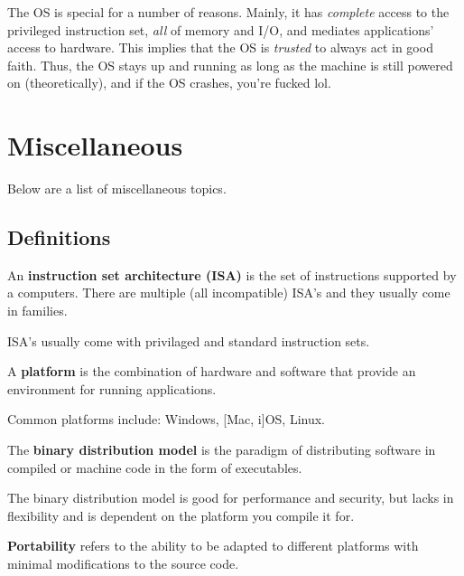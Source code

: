 \documentclass{report}
\begin{document}
The OS is special for a number of reasons. Mainly, it has \textit{complete} access to the privileged
instruction set, \textit{all} of memory and I/O, and mediates applications' access to
hardware. This implies that the OS is \textit{trusted} to always act in good faith. Thus, the OS
stays up and running as long as the machine is still powered on (theoretically), and if the OS crashes,
you're fucked lol.





\section{Miscellaneous}
Below are a list of miscellaneous topics.


\subsection{Definitions}
\label{subsec:DEF}
\begin{tcolorbox}[title=Definition: Instruction Set Architectures]
  An \textbf{instruction set architecture (ISA)} is the set of instructions supported by a
  computers. There are multiple (all incompatible) ISA's and they usually come in families.
\end{tcolorbox}

ISA's usually come with privilaged and standard instruction sets.

\begin{tcolorbox}[title=Definition: Platform]
  A \textbf{platform} is the combination of hardware and software that provide an environment for
  running applications.
\end{tcolorbox}

Common platforms include: Windows, [Mac, i]OS, Linux.

\begin{tcolorbox}[title=Definition: Binary Distribution Model]
  The \textbf{binary distribution model} is the paradigm of distributing software in compiled or
  machine code in the form of executables.
\end{tcolorbox}

The binary distribution model is good for performance and security, but lacks in flexibility and is
dependent on the platform you compile it for.

\begin{tcolorbox}[title=Definition: Portability]
  \textbf{Portability} refers to the ability to be adapted to different platforms with minimal
  modifications to the source code.
\end{tcolorbox}
\end{document}
